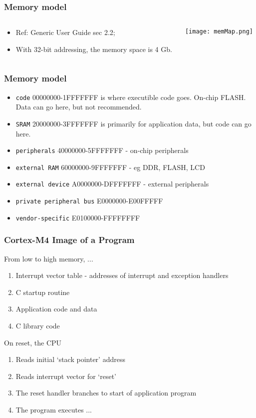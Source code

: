 \documentclass[10pt]{beamer}
\begin{document}
\begin{frame}
\frametitle{Memory model}
\begin{columns}
  \begin{column}{0.5\textwidth}
  \begin{itemize}
  \item Ref: Generic User Guide sec 2.2;
  \item With 32-bit addressing, the memory space is 4 Gb.
  \end{itemize}
  \end{column}
 
  \begin{column}{0.5\textwidth}
  \texttt{[image: memMap.png]}
  \end{column}
\end{columns}
\end{frame}

\begin{frame}
\frametitle{Memory model}
\begin{itemize}
\item \texttt{\color{blue}code} 00000000-1FFFFFFF is where executible code goes. On-chip FLASH. Data can go here, but not recommended.
\item \texttt{\color{blue}SRAM} 20000000-3FFFFFFF is primarily for application data, but code can go here.
\item \texttt{\color{blue}peripherals} 40000000-5FFFFFFF - on-chip peripherals
\item \texttt{\color{blue}external RAM} 60000000-9FFFFFFF - eg DDR, FLASH, LCD
\item \texttt{\color{blue}external device} A0000000-DFFFFFFF - external peripherals
\item \texttt{\color{blue}private peripheral bus} E0000000-E00FFFFF
\item \texttt{\color{blue}vendor-specific} E0100000-FFFFFFFF
\end{itemize}
\end{frame}

\begin{frame}
\frametitle{Cortex-M4 Image of a Program}
From low to high memory, ...
\begin{enumerate}
\item Interrupt vector table - addresses of interrupt and exception handlers
\item C startup routine
\item Application code and data
\item C library code 
\end{enumerate}

On reset, the CPU
\begin{enumerate}
\item Reads initial `stack pointer' address
\item Reads interrupt vector for `reset'
\item The reset handler branches to start of application program
\item The program executes ... 
\end{enumerate}
\end{frame}
\end{document}
